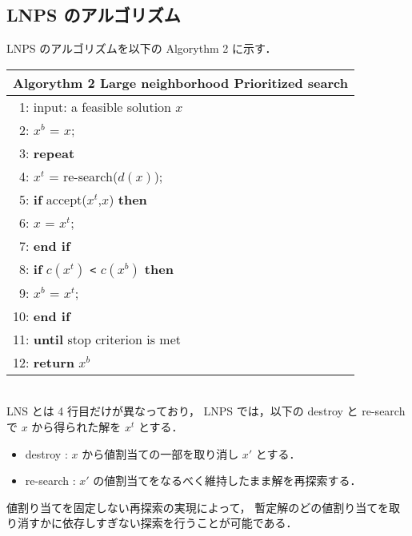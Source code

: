 \subsection{LNPS のアルゴリズム}
LNPS のアルゴリズムを以下の Algorythm 2 に示す．
\begin{table}[htb]
\begin{tabular}{l}\hline
\textbf{Algorythm 2} Large neighborhood Prioritized search\\ \hline
 ~1: input: a feasible solution $x$ \\
 ~2: $x^b$ = $x$; \\
 ~3: \bf{repeat} \\
 ~4: \quad \quad $x^t$ = re-search($d(x)$); \\
 ~5: \quad \quad \textbf{if} accept($x^t$,$x$) \textbf{then} \\
 ~6: \quad \quad \quad \quad $x$ = $x^t$; \\
 ~7: \quad \quad \textbf{end if} \\
 ~8: \quad \quad \textbf{if} $c(x^t)$ \verb|<| $c(x^b)$ \textbf{then} \\
 ~9: \quad \quad \quad \quad $x^b$ = $x^t$; \\
10: \quad \quad \textbf{end if} \\
11: \textbf{until} stop criterion is met \\
12: \textbf{return} $x^b$ \\ \hline
\end{tabular}
\end{table}\\
LNS とは 4 行目だけが異なっており，
LNPS では，以下の destroy と re-search で $x$ から得られた解を $x^t$ とする．
\begin{itemize}
\item destroy : $x$ から値割当ての一部を取り消し $x′$ とする．
\item re-search : $x′$ の値割当てをなるべく維持したまま解を再探索する．
\end{itemize}

値割り当てを固定しない再探索の実現によって，
暫定解のどの値割り当てを取り消すかに依存しすぎない探索を行うことが可能である．